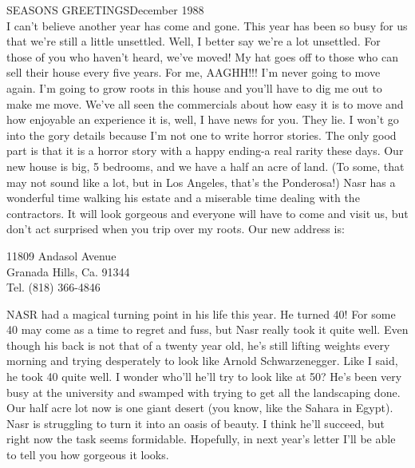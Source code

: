 
%

SEASONS GREETINGS\hfill December 1988\\

I can't believe another year has come and gone. This year has been so busy for us that we're still a little unsettled. Well, I better say we're
a lot unsettled. For those of you who haven't heard, we've moved! My hat goes off to those who can sell their house every five years. For me,
AAGHH!!! I'm never going to move again. I'm going to grow roots in this house and you'll have to dig me out to make me move. We've all seen the
commercials about how easy it is to move and how enjoyable an experience it is, well, I have news for you. They lie. I won't go into the gory
details because I'm not one to write horror stories. The only good part is that it is a horror story with a happy ending-a real rarity these
days. Our new house is big, 5 bedrooms, and we have a half an acre of land. (To some, that may not sound like a lot, but in Los Angeles, that's
the Ponderosa!) Nasr has a wonderful time walking his estate and a miserable time dealing with the contractors. It will look gorgeous and
everyone will have to come and visit us, but don't act surprised when you trip over my roots. Our new address is:
\begin{center}
11809 Andasol Avenue\\
Granada Hills,   Ca.   91344 \\
Tel.   (818) 366-4846
\end{center}

NASR had a magical turning point in his life this year. He turned 40! For some 40 may come as a time to regret and fuss, but Nasr really took it
quite well. Even though his back is not that of a twenty year old, he's still lifting weights every morning and trying desperately to look like
Arnold Schwarzenegger. Like I said, he took 40 quite well. I wonder who'll he'll try to look like at 50? He's been very busy at the university
and swamped with trying to get all the landscaping done. Our half acre lot now is one giant desert (you know, like the Sahara in Egypt). Nasr is
struggling to turn it into an oasis of beauty. I think he'll succeed, but right now the task seems formidable. Hopefully, in next year's letter
I'll be able to tell you how gorgeous it looks.

